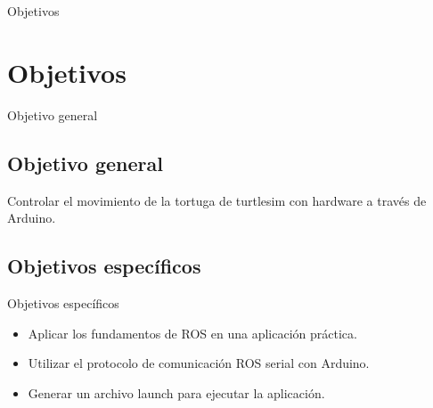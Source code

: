 \documentclass[xcolor=x11names,t]{beamer}
\begin{document}
\begin{frame}{Objetivos}
    \section{Objetivos}  
    \begin{block}{Objetivo general}
        \subsection{Objetivo general}
        Controlar el movimiento de la tortuga de turtlesim con hardware a través de Arduino.
    \end{block}

    \subsection{Objetivos específicos}
    \begin{block}{Objetivos específicos}
        \begin{itemize}
            \item Aplicar los fundamentos de ROS en una aplicación práctica.
            \item Utilizar el protocolo de comunicación ROS serial con Arduino.
            \item Generar un archivo launch para ejecutar la aplicación.
        \end{itemize}
    \end{block}
\end{frame}
\end{document}
